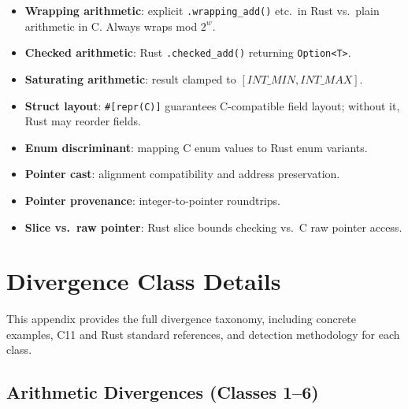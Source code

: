 \documentclass[10pt,a4paper]{article}
\begin{document}
\begin{appendices}
\begin{itemize}[nosep]
  \item \textbf{Wrapping arithmetic}: explicit \texttt{.wrapping\_add()}
    etc.\ in Rust vs.\ plain arithmetic in C.  Always wraps mod $2^w$.
  \item \textbf{Checked arithmetic}: Rust
    \texttt{.checked\_add()} returning \texttt{Option<T>}.
  \item \textbf{Saturating arithmetic}: result clamped to
    $[\mathit{INT\_MIN}, \mathit{INT\_MAX}]$.
  \item \textbf{Struct layout}: \texttt{\#[repr(C)]} guarantees
    C-compatible field layout; without it, Rust may reorder fields.
  \item \textbf{Enum discriminant}: mapping C enum values to Rust
    enum variants.
  \item \textbf{Pointer cast}: alignment compatibility and address
    preservation.
  \item \textbf{Pointer provenance}: integer-to-pointer roundtrips.
  \item \textbf{Slice vs.\ raw pointer}: Rust slice bounds checking
    vs.\ C raw pointer access.
\end{itemize}


\section{Divergence Class Details}\label{app:divergence-details}

This appendix provides the full divergence taxonomy, including
concrete examples, C11 and Rust standard references, and detection
methodology for each class.

\subsection{Arithmetic Divergences (Classes 1--6)}


\end{appendices}
\end{document}
